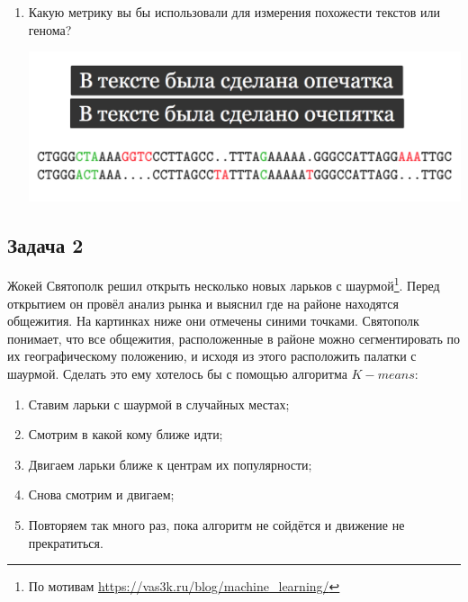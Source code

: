 \documentclass[12pt, a4paper, oneside]{article}
\begin{document}
\begin{enumerate}
\item Какую метрику вы бы использовали для измерения похожести текстов или генома?

\begin{center}
	\includegraphics[scale=0.3]{metr_3.png}
\end{center}


\end{enumerate}


\subsection*{Задача 2}

Жокей Святополк решил открыть несколько новых ларьков с шаурмой\footnote{По мотивам \url{https://vas3k.ru/blog/machine_learning/}}. Перед открытием он провёл анализ рынка и выяснил где на районе находятся общежития.  На картинках ниже они отмечены синими точками.  Святополк понимает, что все общежития, расположенные в районе можно сегментировать по их географическому положению, и исходя из этого расположить палатки с шаурмой. Сделать  это ему хотелось бы с помощью алгоритма $K-means$:

\begin{enumerate}
	\item Ставим ларьки с шаурмой в случайных местах;
	\item Смотрим в какой кому ближе идти;
	\item Двигаем ларьки ближе к центрам их популярности;
	\item Снова смотрим и двигаем;
	\item Повторяем так много раз, пока алгоритм не сойдётся и движение не прекратиться.
\end{enumerate}
\end{document}
